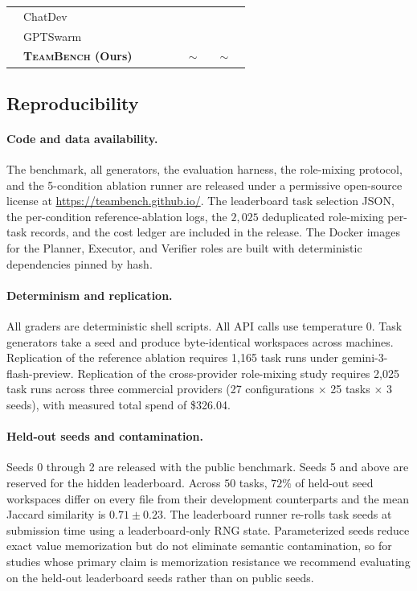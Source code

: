\documentclass{article}
\newcommand{\gcmark}{\textcolor{green!55!black}{\ding{51}}}
\newcommand{\rxmark}{\textcolor{red!75!black}{\ding{55}}}
\newcommand{\partialmark}{\textcolor{orange!85!black}{$\sim$}}
\begin{document}
\begin{table}[h]
{\begin{tabular}{clcccccccc}
  & ChatDev~\citep{qian2024chatdev}         & \rxmark & \rxmark      & \rxmark      & \rxmark & \rxmark      & \rxmark      & \rxmark      & \rxmark \\
  & GPTSwarm~\citep{zhuge2024gptswarm}       & \rxmark & \rxmark      & \rxmark      & \rxmark & \rxmark      & \rxmark      & \rxmark      & \rxmark \\
\midrule
  & \textbf{\textsc{TeamBench} (Ours)} & \gcmark & \gcmark & \gcmark & \gcmark & \partialmark & \gcmark & \partialmark & \gcmark \\
\bottomrule
\end{tabular}%
}
\end{table}

\subsection{Reproducibility}
\label{app:reproducibility}

\paragraph{Code and data availability.}
The benchmark, all generators, the evaluation harness, the role-mixing protocol, and the 5-condition ablation runner are released under a permissive open-source license at \url{https://teambench.github.io/}. The leaderboard task selection JSON, the per-condition reference-ablation logs, the $2{,}025$ deduplicated role-mixing per-task records, and the cost ledger are included in the release. The Docker images for the Planner, Executor, and Verifier roles are built with deterministic dependencies pinned by hash.

\paragraph{Determinism and replication.}
All graders are deterministic shell scripts. All API calls use temperature 0. Task generators take a seed and produce byte-identical workspaces across machines. Replication of the reference ablation requires 1{,}165 task runs under gemini-3-flash-preview. Replication of the cross-provider role-mixing study requires 2{,}025 task runs across three commercial providers (27 configurations $\times$ 25 tasks $\times$ 3 seeds), with measured total spend of \$326.04.

\paragraph{Held-out seeds and contamination.}
Seeds 0 through 2 are released with the public benchmark. Seeds 5 and above are reserved for the hidden leaderboard. Across $50$ tasks, $72\%$ of held-out seed workspaces differ on every file from their development counterparts and the mean Jaccard similarity is $0.71 \pm 0.23$. The leaderboard runner re-rolls task seeds at submission time using a leaderboard-only RNG state. Parameterized seeds reduce exact value memorization but do not eliminate semantic contamination, so for studies whose primary claim is memorization resistance we recommend evaluating on the held-out leaderboard seeds rather than on public seeds.
\end{document}
